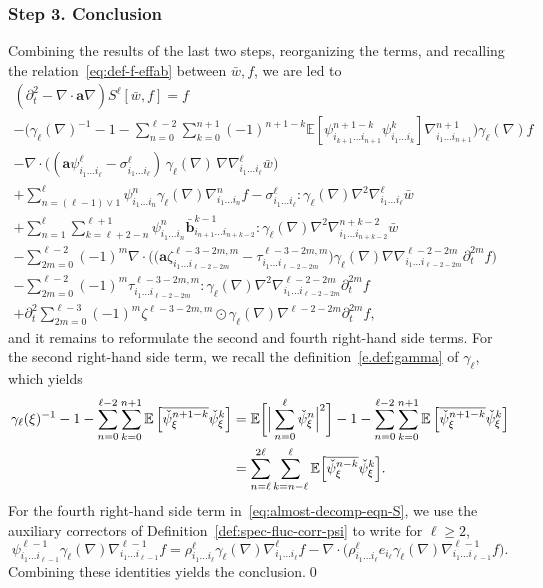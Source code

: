 \documentclass[JEP,XML,SOM,Unicode,published]{cedram}
\theoremstyle{plain}
\theoremstyle{definition}
\numberwithin{equation}{section}
\newcommand{\E}{\mathbb E}
\newcommand{\Aa}{\boldsymbol a}
\newcommand{\bb}{{\boldsymbol b}}
\newcommand{\step}[1]{\subsubsection*{Step \textup #1}}
\newcommand{\expec}[1]{\mathbb{E}\left[ #1 \right]}
\newcommand{\Bexpec}[1]{\mathbb{E}\Bigl[ #1 \Bigr]}
\begin{document}
\step{3. Conclusion}
Combining the results of the last two steps, reorganizing the terms, and recalling the relation~\eqref{eq:def-f-effab} between $\bar w,f$, we are led to
\begin{multline}\label{eq:almost-decomp-eqn-S}
(\partial_t^2-\nabla \cdot \Aa \nabla) S^\ell[\bar w,f]
=f\\
-\bigg(\gamma_\ell(\nabla)^{-1}-1-\sum_{n=0}^{\ell-2}\sum_{k=0}^{n+1}(-1)^{n+1-k}\expec{\psi^{n+1-k}_{i_{k+1}\ldots i_{n+1}}\psi^k_{i_{1}\ldots i_k}}\nabla^{n+1}_{i_1\ldots i_{n+1}}\bigg)\gamma_{\ell}(\nabla)f\\
- \nabla \cdot \Big((\Aa \psi^\ell_{i_1\ldots i_\ell}-\sigma^\ell_{i_1\ldots i_\ell})\,\gamma_\ell(\nabla)\,\nabla\nabla^{\ell}_{i_1\ldots i_{\ell}}\bar w\Big)\\
+\sum_{n=(\ell-1)\vee1}^\ell \psi^n_{i_1\ldots i_n} \gamma_\ell(\nabla) \nabla^n_{i_1\ldots i_n}f-\sigma^\ell_{i_1\ldots i_{\ell}}: \gamma_\ell(\nabla) \nabla^2\nabla^{\ell}_{i_1\ldots i_{\ell}} \bar w
\\
+\sum_{n=1}^\ell \sum_{k=\ell+2-n}^{\ell+1} \psi^n_{i_1\ldots i_n} \bar \bb^{k-1}_{i_{n+1}\ldots i_{n+k-2}}:\gamma_\ell(\nabla)\nabla^2\nabla_{i_1\ldots i_{n+k-2}}^{n+k-2}\bar w\\
-\sum_{2m=0}^{\ell-2}(-1)^m\nabla\cdot\Big(\big(\Aa\zeta^{\ell-3-2m,m}_{i_1\ldots i_{\ell-2-2m}}-\tau^{\ell-3-2m,m}_{i_1\ldots i_{\ell-2-2m}}\big)\gamma_{\ell}(\nabla)\nabla\nabla^{\ell-2-2m}_{i_1\ldots i_{\ell-2-2m}}\partial_t^{2m} f\Big)\\
-\sum_{2m=0}^{\ell-2}(-1)^m\tau^{\ell-3-2m,m}_{i_1\ldots i_{\ell-2-2m}}:\gamma_{\ell}(\nabla)\nabla^2\nabla^{\ell-2-2m}_{i_1\ldots i_{\ell-2-2m}}\partial_t^{2m} f\\
+\partial_t^2\sum_{2m=0}^{\ell-3}(-1)^m\zeta^{\ell-3-2m,m}\odot\gamma_{\ell}(\nabla)\nabla^{\ell-2-2m}\partial_t^{2m} f,
\end{multline}
and it remains to reformulate the second and fourth right-hand side terms.
For the second right-hand side term, we recall the definition~\eqref{e.def:gamma} of $\gamma_\ell$, which yields
\begin{align*}
\gamma_\ell(\xi)^{-1}-1-\sum_{n=0}^{\ell-2}\sum_{k=0}^{n+1}\expec{\overline{\check\psi_\xi^{n+1-k}}\check\psi_\xi^k}
&=\E\bigg[{\Big|\sum_{n=0}^{\ell} \check\psi_\xi^n\Big|^2}\bigg]-1-\sum_{n=0}^{\ell-2}\sum_{k=0}^{n+1}\expec{\overline{\check\psi_\xi^{n+1-k}}\check\psi_\xi^k}\\
&=\sum_{n=\ell}^{2\ell}\sum_{k=n-\ell}^{\ell}\Bexpec{\overline{\check\psi_\xi^{n-k}}\check\psi_\xi^k}.
\end{align*}
For the fourth right-hand side term in~\eqref{eq:almost-decomp-eqn-S}, we use the auxiliary correctors of Definition~\ref{def:spec-fluc-corr-psi} to write for $\ell\ge2$,
\[\psi^{\ell-1}_{i_1\ldots i_{\ell-1}} \gamma_\ell(\nabla) \nabla^{\ell-1}_{i_1\ldots i_{\ell-1}}f=
\rho^{\ell}_{i_1\ldots i_{\ell}}\gamma_\ell(\nabla) \nabla^{\ell}_{i_1\ldots i_{\ell}}f
-\nabla\cdot\Big(\rho^{\ell}_{i_1\ldots i_{\ell}}e_{i_\ell}\gamma_\ell(\nabla) \nabla^{\ell-1}_{i_1\ldots i_{\ell-1}}f\Big).\]
Combining these identities yields the conclusion.\qed
\end{document}
